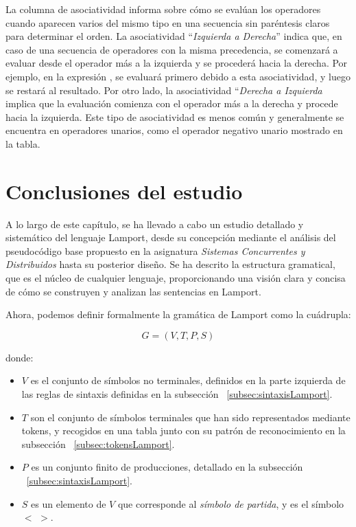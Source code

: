 La columna de asociatividad informa sobre cómo se evalúan los operadores cuando aparecen varios del mismo tipo en una secuencia sin paréntesis claros para determinar el orden. La asociatividad ``\textit{Izquierda a Derecha}'' indica que, en caso de una secuencia de operadores con la misma precedencia, se comenzará a evaluar desde el operador más a la izquierda y se procederá hacia la derecha. Por ejemplo, en la expresión , se evaluará primero  debido a esta asociatividad, y luego se restará  al resultado. Por otro lado, la asociatividad ``\textit{Derecha a Izquierda} implica que la evaluación comienza con el operador más a la derecha y procede hacia la izquierda. Este tipo de asociatividad es menos común y generalmente se encuentra en operadores unarios, como el operador negativo unario mostrado en la tabla.

\section{Conclusiones del estudio}
A lo largo de este capítulo, se ha llevado a cabo un estudio detallado y sistemático del lenguaje Lamport, desde su concepción mediante el análisis del pseudocódigo base propuesto en la asignatura \textit{Sistemas Concurrentes y Distribuidos} hasta su posterior diseño. Se ha descrito la estructura gramatical, que es el núcleo de cualquier lenguaje, proporcionando una visión clara y concisa de cómo se construyen y analizan las sentencias en Lamport.


\noindent
Ahora, podemos definir formalmente la gramática de Lamport como la cuádrupla:

$$
G = (V,T,P,S)
$$

\noindent
donde:

\begin{itemize}
    \item $V$ es el conjunto de símbolos no terminales, definidos en la parte izquierda de las reglas de sintaxis definidas en la subsección ~\ref{subsec:sintaxisLamport}.
    \item $T$ son el conjunto de símbolos terminales que han sido representados mediante tokens, y recogidos en una tabla junto con su patrón de reconocimiento en la subsección ~\ref{subsec:tokensLamport}.
    \item $P$ es un conjunto finito de producciones, detallado en la subsección ~\ref{subsec:sintaxisLamport}.
    \item $S$ es un elemento de $V$ que corresponde al \textit{símbolo de partida}, y es el símbolo \hspace{0.5cm} $<$  $>$.
\end{itemize}

